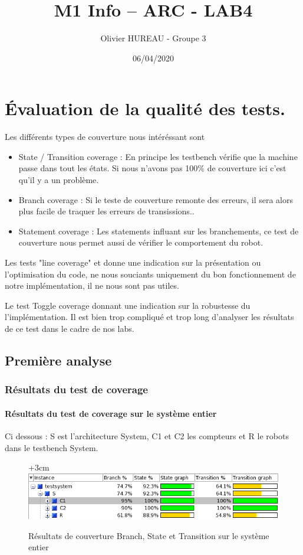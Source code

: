 \documentclass{article}
\title{M1 Info – ARC - LAB4}
\author{Olivier HUREAU - Groupe 3}
\date{06/04/2020}
\begin{document}
\maketitle
\renewcommand{\contentsname}{Table des matières}
\tableofcontents
\newpage

\section{Évaluation de la qualité des tests.}
Les différents types de couverture nous intéréssant sont 
\begin{itemize}
	\item State / Transition coverage : En principe les testbench vérifie que la machine passe dans tout les états. Si nous n'avons pas 100\% de couverture ici c'est qu'il y a un problème.
		\item Branch coverage : Si le teste de couverture remonte des erreurs, il sera alors plus facile de traquer les erreurs de transissions..
	\item Statement coverage : Les statements influant sur les branchements, ce test de couverture nous permet aussi de vérifier le comportement du robot.

\end{itemize}

Les tests "line coverage" et  donne une indication sur la présentation ou l'optimisation du code, ne nous souciants uniquement du bon fonctionnement de notre implémentation, il ne nous sont pas utiles.

Le test Toggle coverage donnant une indication sur la robustesse du l'implémentation. Il est bien trop compliqué et trop long d'analyser les résultats de ce test dans le cadre de nos labs.


\subsection{Première analyse}

\subsubsection{Résultats du test de coverage}

\paragraph{Résultats du test de coverage sur le système entier}

Ci dessous : S est l'architecture System, C1 et C2 les compteurs et R le robots dans le testbench System.
\begin{figure}[!h]
\advance\leftskip+3cm
\includegraphics[scale=0.70]{PremiereAnalyse/Coverage.PNG}
\caption{Résultats de couverture Branch, State et Transition sur le système entier}
\end{figure}
\end{document}
